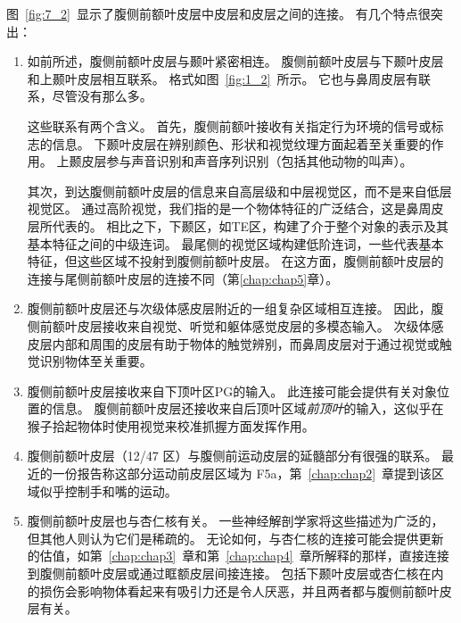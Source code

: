 图~\ref{fig:7_2}~显示了腹侧前额叶皮层中皮层和皮层之间的连接。
有几个特点很突出：
\begin{enumerate}
\item 如前所述，腹侧前额叶皮层与颞叶紧密相连。
腹侧前额叶皮层与下颞叶皮层\cite{ungerleider1989projections,webster1994connections}和上颞叶皮层\cite{seltzer1996overlapping,petrides2002comparative}相互联系。
格式如图~\ref{fig:1_2}~所示。
它也与鼻周皮层有联系\cite{suzuki1994perirhinal,saleem2008complementary}，尽管没有那么多。
\par


这些联系有两个含义。
首先，腹侧前额叶接收有关指定行为环境的信号或标志的信息。
下颞叶皮层在辨别颜色、形状和视觉纹理方面起着至关重要的作用\cite{huxlin2000perceptual}。
上颞皮层参与声音识别\cite{tian2001functional}和声音序列识别\cite{micheyl2005perceptual}（包括其他动物的叫声\cite{rauschecker1995processing}）。 
\par


其次，到达腹侧前额叶皮层的信息来自高层级和中层视觉区，而不是来自低层视觉区。
通过高阶视觉，我们指的是一个物体特征的广泛结合，这是鼻周皮层所代表的\cite{murray2007visual}。
相比之下，下颞区，如TE区，构建了介于整个对象的表示及其基本特征之间的中级连词\cite{murray2007visual}。
最尾侧的视觉区域构建低阶连词，一些代表基本特征，但这些区域不投射到腹侧前额叶皮层\cite{webster1994connections}。
在这方面，腹侧前额叶皮层的连接与尾侧前额叶皮层的连接不同（第\ref{chap:chap5}章）。

\item 腹侧前额叶皮层还与次级体感皮层附近的一组复杂区域相互连接\cite{petrides2002comparative}。
因此，腹侧前额叶皮层接收来自视觉、听觉和躯体感觉皮层的多模态输入。
次级体感皮层内部和周围的皮层有助于物体的触觉辨别\cite{mishkin1979analogous}，而鼻周皮层对于通过视觉或触觉识别物体至关重要\cite{goulet2001neural,murray2007visual}。

\item 腹侧前额叶皮层接收来自下顶叶区PG的输入\cite{petrides2002comparative}。
此连接可能会提供有关对象位置的信息。
腹侧前额叶皮层还接收来自后顶叶区域\textit{前顶叶}的输入，这似乎在猴子拾起物体时使用视觉来校准抓握方面发挥作用\cite{fogassi2001cortical}。

\item 腹侧前额叶皮层（12/47 区）与腹侧前运动皮层的延髓部分有很强的联系。 
最近的一份报告称这部分运动前皮层区域为 F5a\cite{gerbella2011cortical}，第~\ref{chap:chap2}~章提到该区域似乎控制手和嘴的运动。 

\item 腹侧前额叶皮层也与杏仁核有关。
一些神经解剖学家将这些描述为广泛的\cite{amaral1984amygdalo,stefanacci2002some}，但其他人则认为它们是稀疏的\cite{carmichael1995limbic,price2010neurocircuitry}。
无论如何，与杏仁核的连接可能会提供更新的估值，如第~\ref{chap:chap3}~章和第~\ref{chap:chap4}~章所解释的那样，直接连接到腹侧前额叶皮层或通过眶额皮层间接连接。
包括下颞叶皮层\cite{horel1975partial}或杏仁核\cite{horel1975partial}在内的损伤会影响物体看起来有吸引力还是令人厌恶，并且两者都与腹侧前额叶皮层有关。
\end{enumerate}



